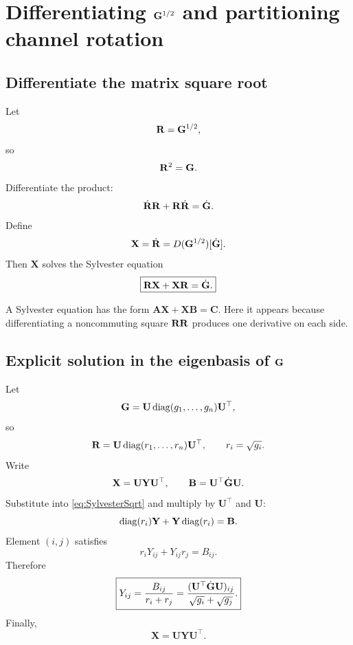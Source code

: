 \chapter{Differentiating \(\mathbf{G}^{1/2}\) and partitioning channel rotation}

\section{Differentiate the matrix square root}

Let
\begin{equation}
\mathbf{R}=\mathbf{G}^{1/2},
\end{equation}
so
\begin{equation}
\mathbf{R}^2=\mathbf{G}.
\end{equation}
Differentiate the product:
\begin{equation}
\dot{\mathbf{R}}\mathbf{R}+\mathbf{R}\dot{\mathbf{R}}=\dot{\mathbf{G}}.
\end{equation}
Define
\begin{equation}
\mathbf X=\dot{\mathbf{R}}=D(\mathbf{G}^{1/2})[\dot{\mathbf{G}}].
\end{equation}
Then \(\mathbf X\) solves the Sylvester equation
\begin{equation}
\boxed{\mathbf{R}\mathbf X+\mathbf X\mathbf{R}=\dot{\mathbf{G}}.}
\label{eq:SylvesterSqrt}
\end{equation}

\usual A Sylvester equation has the form \(\mathbf A\mathbf X+\mathbf X\mathbf B=\mathbf C\). Here it appears because differentiating a noncommuting square \(\mathbf{R}\mathbf{R}\) produces one derivative on each side.

\section{Explicit solution in the eigenbasis of \(\mathbf{G}\)}

Let
\begin{equation}
\mathbf{G}=\mathbf U\operatorname{diag}(g_1,\ldots,g_n)\mathbf U^\top,
\end{equation}
so
\begin{equation}
\mathbf{R}=\mathbf U\operatorname{diag}(r_1,\ldots,r_n)\mathbf U^\top,
\qquad r_i=\sqrt{g_i}.
\end{equation}
Write
\begin{equation}
\mathbf X=\mathbf U\mathbf Y\mathbf U^\top,
\qquad
\mathbf B=\mathbf U^\top\dot{\mathbf{G}}\mathbf U.
\end{equation}
Substitute into \cref{eq:SylvesterSqrt} and multiply by \(\mathbf U^\top\) and \(\mathbf U\):
\begin{equation}
\operatorname{diag}(r_i)\mathbf Y+\mathbf Y\operatorname{diag}(r_i)=\mathbf B.
\end{equation}
Element \((i,j)\) satisfies
\begin{equation}
r_iY_{ij}+Y_{ij}r_j=B_{ij}.
\end{equation}
Therefore
\begin{equation}
\boxed{
Y_{ij}=\frac{B_{ij}}{r_i+r_j}
=\frac{(\mathbf U^\top\dot{\mathbf{G}}\mathbf U)_{ij}}
{\sqrt{g_i}+\sqrt{g_j}}.}
\label{eq:SqrtDerivativeElements}
\end{equation}
Finally,
\begin{equation}
\mathbf X=\mathbf U\mathbf Y\mathbf U^\top.
\end{equation}

